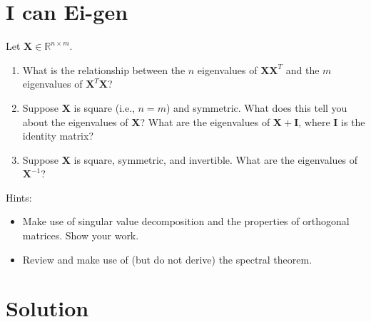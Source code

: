 \documentclass[submit]{harvardml}
\newcommand{\R}{\mathbb{R}}
\renewcommand{\v}[1]{\mathbf{#1}}
\begin{document}
\section*{I can Ei-gen}
\begin{problem}
    Let $\v X \in \R^{n \times m}$.
    \begin{enumerate}[label=(\alph*)]
        \item What is the relationship between the $n$ eigenvalues
              of $\v X \v X^T$ and the $m$ eigenvalues of $\v X^T \v X$?
        \item Suppose $\v X$ is square (i.e., $n=m$) and symmetric.
              What does this tell you about the eigenvalues of $\v X$?
              What are the eigenvalues of $\v X + \v I$, where $\v I$ is the identity matrix?
        \item Suppose $\v X$ is square, symmetric, and invertible.
			  What are the eigenvalues of $\v X^{-1}$?
	\end{enumerate}
	Hints:
	\begin{itemize}
		\item Make use of singular value decomposition and the properties
			  of orthogonal matrices. Show your work.
		\item Review and make use of (but do not derive) the spectral theorem.
	\end{itemize}
\end{problem}

\section*{Solution}
\end{document}
